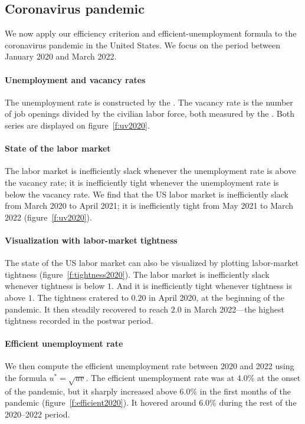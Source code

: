 \documentclass[letterpaper,12pt,leqno]{article}
\begin{document}
\subsection{Coronavirus pandemic}\label{s:pandemic}

We now apply our efficiency criterion and efficient-unemployment formula to the coronavirus pandemic in the United States. We focus on the period between January 2020 and March 2022.

\paragraph{Unemployment and vacancy rates} The unemployment rate is constructed by the \citet{UNRATE}. The vacancy rate is the number of job openings divided by the civilian labor force, both measured by the \citet{CLF16OV,JTSJOL}. Both series are displayed on figure~\ref{f:uv2020}.

\paragraph{State of the labor market} The labor market is inefficiently slack whenever the unemployment rate is above the vacancy rate; it is inefficiently tight whenever the unemployment rate is below the vacancy rate. We find that the US labor market is inefficiently slack from March 2020 to April 2021; it is inefficiently tight from May 2021 to March 2022 (figure~\ref{f:uv2020}).

\paragraph{Visualization with labor-market tightness} The state of the US labor market can also be visualized by plotting labor-market tightness (figure~\ref{f:tightness2020}). The labor market is inefficiently slack whenever tightness is below $1$. And it is inefficiently tight whenever tightness is above $1$. The tightness cratered to $0.20$ in April 2020, at the beginning of the pandemic. It then steadily recovered to reach $2.0$ in March 2022---the highest tightness recorded in the postwar period.

\paragraph{Efficient unemployment rate} We then compute the efficient unemployment rate between 2020 and 2022 using the formula $u^* = \sqrt{uv}$. The efficient unemployment rate was at $4.0\%$ at the onset of the pandemic, but it sharply increased above $6.0\%$ in the first months of the pandemic (figure~\ref{f:efficient2020}). It hovered around $6.0\%$ during the rest of the 2020--2022 period.
\end{document}
